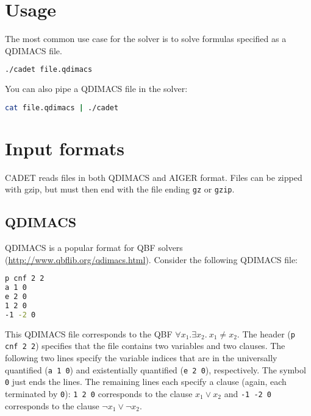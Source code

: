 \documentclass{article}
\begin{document}
\section{Usage}

The most common use case for the solver is to solve formulas specified as a QDIMACS file. 

\begin{lstlisting}[language = bash,
				   basicstyle=\footnotesize\ttfamily,
                   xleftmargin = 1cm,
                   framexleftmargin = 1em]
./cadet file.qdimacs
\end{lstlisting}

\noindent
You can also pipe a QDIMACS file in the solver:
\begin{lstlisting}[language = bash,
				   basicstyle=\footnotesize\ttfamily,
                   xleftmargin = 1cm,
                   framexleftmargin = 1em]
cat file.qdimacs | ./cadet
\end{lstlisting}

\section{Input formats}

CADET reads files in both QDIMACS and AIGER format.
Files can be zipped with gzip, but must then end with the file ending \texttt{gz} or \texttt{gzip}.

\subsection{QDIMACS}

QDIMACS is a popular format for QBF solvers (\url{http://www.qbflib.org/qdimacs.html}). 
Consider the following QDIMACS file:
\begin{lstlisting}[language = bash,
				   basicstyle=\footnotesize\ttfamily,
                   xleftmargin = 1cm,
                   framexleftmargin = 1em]
p cnf 2 2
a 1 0
e 2 0
1 2 0
-1 -2 0
\end{lstlisting}
This QDIMACS file corresponds to the QBF $\forall x_1.\exists x_2.~ x_1\neq x_2$. 
The header (\texttt{p cnf 2 2}) specifies that the file contains two variables and two clauses.
The following two lines specify the variable indices that are in the universally quantified (\texttt{a 1 0}) and existentially quantified (\texttt{e 2 0}), respectively. 
The symbol \texttt{0} just ends the lines. 	
The remaining lines each specify a clause (again, each terminated by \texttt{0}): \texttt{1 2 0} corresponds to the clause $x_1\vee x_2$ and \texttt{-1 -2 0} corresponds to the clause $\neg x_1\vee \neg x_2$. 
\end{document}
